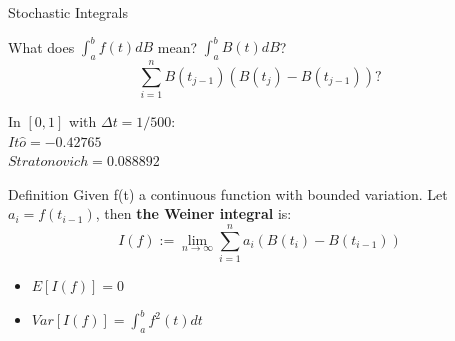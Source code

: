 \begin{frame}{Stochastic Integrals}
\pause
\begin{center}
What does $\int_{a}^{b} f(t)dB$ mean? \bigskip \pause  $\int_{a}^{b} B(t)dB$?\pause \\

\begin{equation*}
\sum_{i=1}^{n}B(t_{j-1})\left( B(t_{j})-B(t_{j-1})\right) ?
\end{equation*}
\pause
\bigskip

In $[0,1]$ with $\Delta t=1/500$:\\ \pause
$It\hat{o}=-0.42765$\\ \pause
$Stratonovich=0.088892$
\end{center}
\end{frame}




\begin{frame}
\begin{block}{Definition}
Given f(t) a continuous function with bounded variation. Let $a_i=f(t_{i-1})$, then \textbf{the Weiner integral} is:
\begin{equation*}
I(f):=\lim_{n \to \infty}\sum_{i=1}^{n}a_i(B(t_i)-B(t_{i-1}))
\end{equation*}
\pause
\begin{itemize}
\item $E[I(f)]=0$
\item $Var[I(f)]=\int_{a}^{b}f^2(t)dt$
\end{itemize}
\end{block}
\end{frame}
